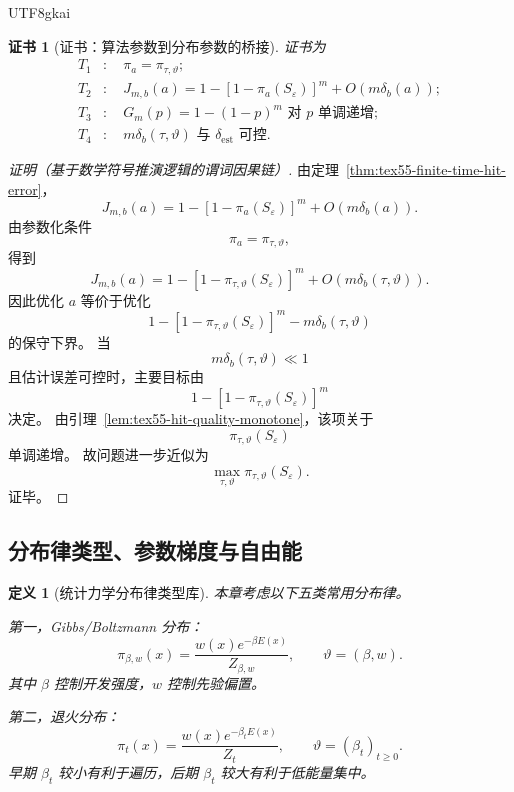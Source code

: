 \documentclass[12pt]{article}
\newtheorem{definition}{定义}[section]
\newtheorem{Certificate}{证书}[section]
\begin{document}
\begin{CJK*}{UTF8}{gkai}
\begin{Certificate}[证书：算法参数到分布参数的桥接]
\label{cert:tex55-local-selection-equivalence}
证书为
\[
\begin{aligned}
  T_1&:\quad \pi_a=\pi_{\tau,\vartheta};\\
  T_2&:\quad
  J_{m,b}(a)
  =
  1-\left[1-\pi_a(S_\varepsilon)\right]^m
  +O(m\delta_b(a));\\
  T_3&:\quad
  G_m(p)=1-(1-p)^m\text{ 对 }p\text{ 单调递增};\\
  T_4&:\quad
  m\delta_b(\tau,\vartheta)\text{ 与 }\delta_{\mathrm{est}}\text{ 可控}.
\end{aligned}
\]
\end{Certificate}

\begin{proof}[证明（基于数学符号推演逻辑的谓词因果链）]
由定理~\ref{thm:tex55-finite-time-hit-error}，
\[
  J_{m,b}(a)
  =
  1-
  \left[
  1-\pi_a(S_\varepsilon)
  \right]^m
  +
  O(m\delta_b(a)).
\]
由参数化条件
\[
  \pi_a=\pi_{\tau,\vartheta},
\]
得到
\[
  J_{m,b}(a)
  =
  1-
  \left[
  1-\pi_{\tau,\vartheta}(S_\varepsilon)
  \right]^m
  +
  O(m\delta_b(\tau,\vartheta)).
\]
因此优化 \(a\) 等价于优化
\[
  1-
  \left[
  1-\pi_{\tau,\vartheta}(S_\varepsilon)
  \right]^m
  -
  m\delta_b(\tau,\vartheta)
\]
的保守下界。
当
\[
  m\delta_b(\tau,\vartheta)\ll1
\]
且估计误差可控时，主要目标由
\[
  1-
  \left[
  1-\pi_{\tau,\vartheta}(S_\varepsilon)
  \right]^m
\]
决定。
由引理~\ref{lem:tex55-hit-quality-monotone}，该项关于
\[
  \pi_{\tau,\vartheta}(S_\varepsilon)
\]
单调递增。
故问题进一步近似为
\[
  \max_{\tau,\vartheta}\pi_{\tau,\vartheta}(S_\varepsilon).
\]
证毕。
\end{proof}

\subsection{分布律类型、参数梯度与自由能}
\label{subsec:tex55-law-types-gradient-free-energy}

\begin{definition}[统计力学分布律类型库]
\label{def:tex55-law-type-library}
本章考虑以下五类常用分布律。

第一，Gibbs/Boltzmann 分布：
\[
  \pi_{\beta,w}(x)
  =
  \frac{w(x)e^{-\beta E(x)}}{Z_{\beta,w}},
  \qquad
  \vartheta=(\beta,w).
\]
其中 \(\beta\) 控制开发强度，\(w\) 控制先验偏置。

第二，退火分布：
\[
  \pi_t(x)
  =
  \frac{w(x)e^{-\beta_tE(x)}}{Z_t},
  \qquad
  \vartheta=(\beta_t)_{t\ge0}.
\]
早期 \(\beta_t\) 较小有利于遍历，后期 \(\beta_t\) 较大有利于低能量集中。


\end{definition}
\end{CJK*}
\end{document}
